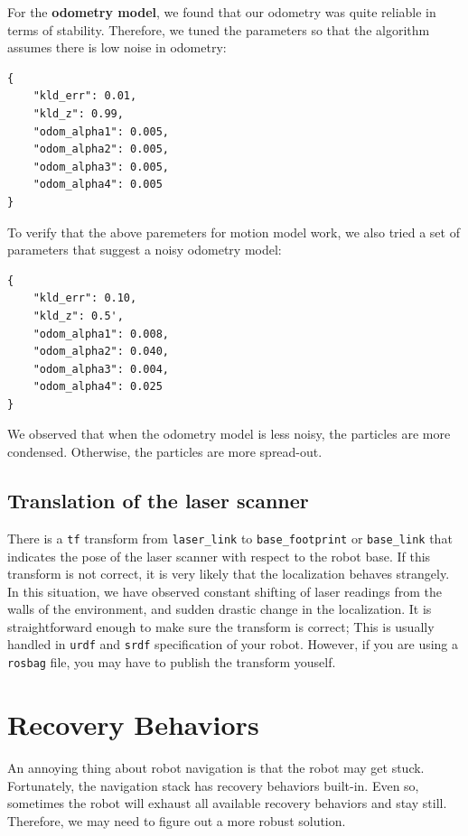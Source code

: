 \documentclass[12pt]{article}
\begin{document}
For the \textbf{odometry model}, we found that our odometry was quite reliable in terms of stability. Therefore, we tuned the parameters so that the algorithm assumes there is low noise in odometry:
\lstset{language=json}
\begin{lstlisting}
{   
    "kld_err": 0.01,
    "kld_z": 0.99,
    "odom_alpha1": 0.005,
    "odom_alpha2": 0.005,
    "odom_alpha3": 0.005,
    "odom_alpha4": 0.005
}
\end{lstlisting}
To verify that the above paremeters for motion model work, we also tried a set of parameters that suggest a noisy odometry model:
\lstset{language=json}
\begin{lstlisting}
{
    "kld_err": 0.10,
    "kld_z": 0.5',                                                                            
    "odom_alpha1": 0.008,                                                                     
    "odom_alpha2": 0.040,                                                                     
    "odom_alpha3": 0.004,                                                                     
    "odom_alpha4": 0.025                                                                      
} 
\end{lstlisting}
We observed that when the odometry model is less noisy, the particles are more condensed. Otherwise, the particles are more spread-out.

\subsection{Translation of the laser scanner}

There is a \texttt{tf} transform from \texttt{laser\_link} to \texttt{base\_footprint} or \texttt{base\_link} that indicates the pose of the laser scanner with respect to the robot base. If this transform is not correct, it is very likely that the localization behaves strangely. In this situation, we have observed constant shifting of laser readings from the walls of the environment, and sudden drastic change in the localization. It is straightforward enough to make sure the transform is correct; This is usually handled in \texttt{urdf} and \texttt{srdf} specification of your robot. However, if you are using a \texttt{rosbag} file, you may have to publish the transform youself.


\section{Recovery Behaviors}
An annoying thing about robot navigation is that the robot may get stuck. Fortunately, the navigation stack has recovery behaviors built-in. Even so, sometimes the robot will exhaust all available recovery behaviors and stay still. Therefore, we may need to figure out a more robust solution.
\end{document}
